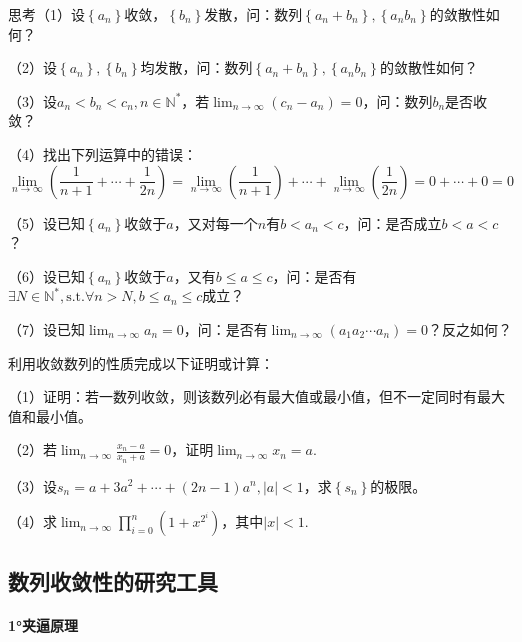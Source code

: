 {\kaiti{}思考\quad （1）设\(\left\{ a_{n} \right\}\)收敛，\(\left\{ b_{n} \right\}\)发散，问：数列\(\left\{ a_{n} + b_{n} \right\} , \left\{ a_{n} b_{n} \right\}\)的敛散性如何？

（2）设\(\left\{ a_{n} \right\} , \left\{ b_{n} \right\}\)均发散，问：数列\(\left\{ a_{n} + b_{n} \right\} , \left\{ a_{n} b_{n} \right\}\)的敛散性如何？

（3）设\(a_{n} < b_{n} < c_{n} , n \in \mathbb{N}^{*}\)，若\(\lim_{n \to \infty} \left( c_{n} - a_{n} \right) = 0\)，问：数列\(b_{n}\)是否收敛？

（4）找出下列运算中的错误：
\begin{equation*}
    \lim_{n \to \infty} \left( \frac{1}{n + 1} + \cdots + \frac{1}{2 n} \right) = \lim_{n \to \infty} \left( \frac{1}{n + 1} \right) + \cdots + \lim_{n \to \infty} \left( \frac{1}{2 n} \right) = 0 + \cdots + 0 = 0
\end{equation*}

（5）设已知\(\left\{ a_{n} \right\}\)收敛于\(a\)，又对每一个\(n\)有\(b < a_{n} < c\)，问：是否成立\(b < a < c\)？

（6）设已知\(\left\{ a_{n} \right\}\)收敛于\(a\)，又有\(b \le a \le c\)，问：是否有\(\exists N \in \mathbb{N}^{*} , \text{s.t.} \forall n > N , b \le a_{n} \le c\)成立？

（7）设已知\(\lim_{n \to \infty} a_{n} = 0\)，问：是否有\(\lim_{n \to \infty} \left( a_{1} a_{2} \cdots a_{n} \right) = 0\)？反之如何？}

\begin{example}

    利用收敛数列的性质完成以下证明或计算：

    （1）证明：若一数列收敛，则该数列必有最大值或最小值，但不一定同时有最大值和最小值。

    （2）若\(\lim_{n \to \infty} \frac{x_{n} - a}{x_{n} + a} =
    0\)，证明\(\lim_{n \to \infty} x_{n} = a\).

    （3）设\(s_{n} = a + 3 a^{2} + \cdots + \left( 2 n - 1 \right) a^{n} , \left| a
    \right| < 1\)，求\(\left\{ s_{n} \right\}\)的极限。

    （4）求\(\lim_{n \to \infty} \prod _{i = 0}^{n} \left( 1 + x^{2^{i}}
    \right)\)，其中\(\left| x \right| < 1\).
\end{example}

\subsection{数列收敛性的研究工具}
\paragraph{1°夹逼原理} \mbox{}

